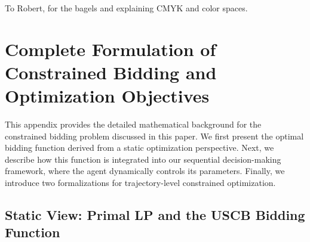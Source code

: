 \documentclass[sigconf, anonymous, review]{acmart}
\begin{document}

\begin{acks}
To Robert, for the bagels and explaining CMYK and color spaces.
\end{acks}






\newpage

\appendix


\section{Complete Formulation of Constrained Bidding and Optimization Objectives}
\label{app:constrained_formulation}

This appendix provides the detailed mathematical background for the constrained bidding problem discussed in this paper.
We first present the optimal bidding function derived from a static optimization perspective. 
Next, we describe how this function is integrated into our sequential decision-making framework, where the agent dynamically controls its parameters.
Finally, we introduce two formalizations for trajectory-level constrained optimization.

\subsection{Static View: Primal LP and the USCB Bidding Function}
\label{app:static_view}
\end{document}
